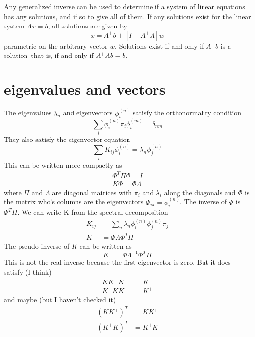 \documentclass[a4paper]{article}
\newcommand{\evec}[2]{\phi^{(#2)}_{#1}}
\begin{document}
Any generalized inverse can be used to determine if a system of linear equations has any solutions, and if so to give all of them. If any solutions exist for the linear system $Ax=b$, all solutions are given by
\begin{equation}
x=A^{+} b  + [I - A^{+} A ] w
\end{equation}
parametric on the arbitrary vector $w$.
Solutions exist if and only if $A^{+} b$ is a solution--that is, if and only if $A^{+} A b = b$.

\section{eigenvalues and vectors}

The eigenvalues $\lambda_n$ and eigenvectors $\phi^{(n)}_i$ satisfy the orthonormality condition
\begin{equation}
\sum_i \phi^{(n)}_i \pi_i \phi^{(m)}_i = \delta_{nm}
\end{equation}
They also satisfy the eigenvector equation
\begin{equation}
\sum_i K_{ij} \evec{i}{n}  = \lambda_n \evec{j}{n}
\end{equation}
This can be written more compactly as
\begin{align}
\Phi^{T} \Pi \Phi = I \\
K \Phi = \Phi \Lambda
\end{align}
where $\Pi$ and $\Lambda$ are diagonal matrices with $\pi_i$ and $\lambda_i$ along the diagonals
and $\Phi$ is the matrix who's columns are the eigenvectors $\Phi_{in} = \evec{i}{n}$.
The inverse of $\Phi$ is $\Phi^{T} \Pi$.
We can write K from the spectral decomposition
\begin{align}
K_{ij} &= \sum_n \lambda_n \evec{i}{n} \evec{j}{n} \pi_j \\
K &= \Phi \Lambda \Phi^T \Pi
\end{align}
The pseudo-inverse of $K$ can be written as
\begin{equation}
K^{+} = \Phi \Lambda^{-1} \Phi^T \Pi
\end{equation}
This is not the real inverse because the first eigenvector is zero.  But it does satisfy (I think)
\begin{align}
K K^{+} K &= K \\
K^{+} K K^{+} &= K^{+}
\end{align}
and maybe (but I haven't checked it)
\begin{align}
(K K^{+})^T &= K K^{+} \\
(K^{+} K)^T &= K^{+} K
\end{align}
\end{document}
